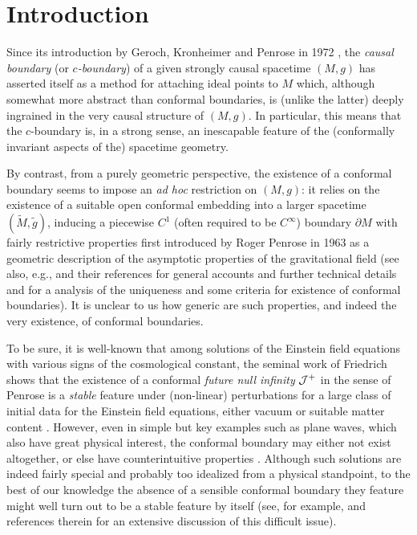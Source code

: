 \section{Introduction}

Since its introduction by Geroch, Kronheimer and Penrose in 1972 \cite{GerochIdealPointsSpaceTime1972}, the {\em causal boundary} (or {\em $c$-boundary}) of a given strongly causal spacetime $(M,g)$ has asserted itself as a method for attaching ideal points to $M$ which, although somewhat more abstract than conformal boundaries, is (unlike the latter) deeply ingrained in the very causal structure of $(M,g)$. In particular, this means that the $c$-boundary is, in a strong sense, an inescapable feature of the (conformally invariant aspects of the) spacetime geometry.

By contrast, from a purely geometric perspective, the existence of a conformal boundary seems to impose an {\em ad hoc} restriction on $(M,g)$: it relies on the existence of a suitable open conformal embedding into a larger spacetime $(\tilde{M},\tilde{g})$, inducing a piecewise $C^1$ (often required to be $C^{\infty}$) boundary $\partial M$ with fairly restrictive properties first introduced by Roger Penrose in 1963 as a geometric description of the asymptotic properties of the gravitational field \cite{PenroseAsymptoticStructure1963,PenroseConformalInfinity1964} (see also, e.g., \cite{HawkingLargeScaleStructure1975,WaldGeneralRelativity1984,Frauendiener2004} and their references for general accounts and further technical details and \cite{ChruscielConformalboundaryextensions2010} for a analysis of the uniqueness and some criteria for existence of conformal boundaries). It is unclear to us how generic are such properties, and indeed the very existence, of conformal boundaries.

To be sure, it is well-known that among solutions of the Einstein field equations with various signs of the cosmological constant, the seminal work of Friedrich \cite{Friedrich1,Friedrich2,Friedrich3} shows that the existence of a conformal {\em future null infinity} ${\cal J}^+$ in the sense of Penrose is a {\em stable} feature under (non-linear) perturbations for a large class of initial data for the Einstein field equations, either vacuum or suitable matter content \cite{Friedrich2,ChruschielDelayExistenceAsymptoticallySimple2002}. However, even in simple but key examples such as plane waves, which also have great physical interest, the conformal boundary may either not exist altogether, or else have counterintuitive properties \cite{Florescausalboundarywavetype2008}. Although such solutions are indeed fairly special and probably too idealized from a physical standpoint, to the best of our knowledge the absence of a sensible conformal boundary they feature might well turn out to be a stable feature by itself (see, for example, \cite{Friedrich3} and references therein for an extensive discussion of this difficult issue).

